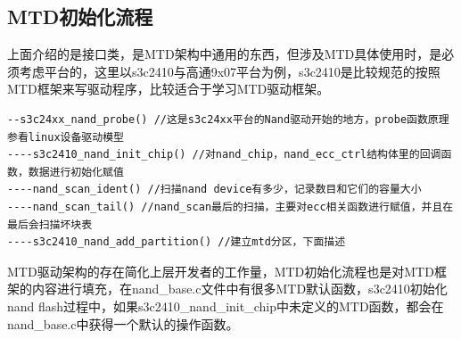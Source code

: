 \subsection{MTD初始化流程}
上面介绍的是接口类，是MTD架构中通用的东西，但涉及MTD具体使用时，是必须考虑平台的，这里以s3c2410与高通9x07平台为例，s3c2410是比较规范的按照MTD框架来写驱动程序，比较适合于学习MTD驱动框架。
\begin{mdframed}[style=leftredline]
\begin{verbatim}
--s3c24xx_nand_probe() //这是s3c24xx平台的Nand驱动开始的地方，probe函数原理参看linux设备驱动模型
----s3c2410_nand_init_chip() //对nand_chip，nand_ecc_ctrl结构体里的回调函数，数据进行初始化赋值
----nand_scan_ident() //扫描nand device有多少，记录数目和它们的容量大小
----nand_scan_tail() //nand_scan最后的扫描，主要对ecc相关函数进行赋值，并且在最后会扫描坏块表
----s3c2410_nand_add_partition() //建立mtd分区，下面描述
\end{verbatim}
\end{mdframed}
MTD驱动架构的存在简化上层开发者的工作量，MTD初始化流程也是对MTD框架的内容进行填充，在nand\_base.c文件中有很多MTD默认函数，s3c2410初始化nand flash过程中，如果s3c2410\_nand\_init\_chip中未定义的MTD函数，都会在nand\_base.c中获得一个默认的操作函数。

